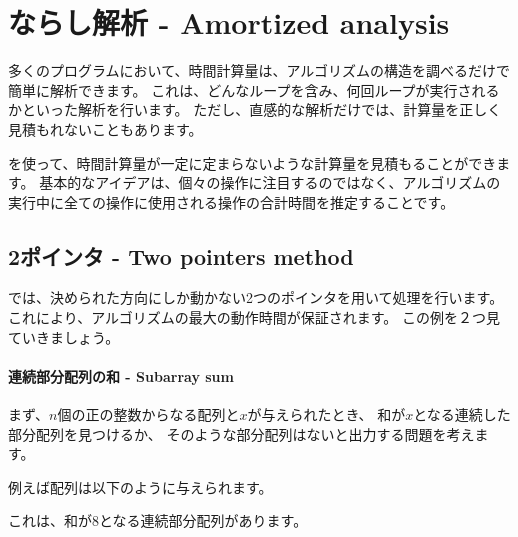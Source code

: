 \chapter{ならし解析 - Amortized analysis}


多くのプログラムにおいて、時間計算量は、アルゴリズムの構造を調べるだけで簡単に解析できます。
これは、どんなループを含み、何回ループが実行されるかといった解析を行います。
ただし、直感的な解析だけでは、計算量を正しく見積もれないこともあります。

 を使って、時間計算量が一定に定まらないような計算量を見積もることができます。
基本的なアイデアは、個々の操作に注目するのではなく、アルゴリズムの実行中に全ての操作に使用される操作の合計時間を推定することです。

\section{2ポインタ - Two pointers method}


では、決められた方向にしか動かない2つのポインタを用いて処理を行います。
これにより、アルゴリズムの最大の動作時間が保証されます。
この例を２つ見ていきましょう。

\subsubsection{連続部分配列の和 - Subarray sum}

まず、$n$個の正の整数からなる配列と$x$が与えられたとき、
和が$x$となる連続した部分配列を見つけるか、
そのような部分配列はないと出力する問題を考えます。

例えば配列は以下のように与えられます。
\begin{center}
\end{center}
これは、和が$8$となる連続部分配列があります。
\begin{center}
\end{center}

